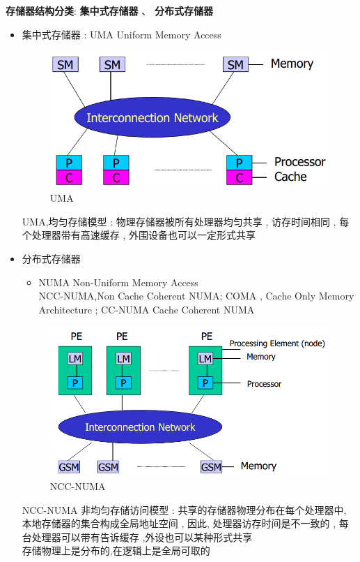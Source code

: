 \documentclass[UTF8,a4paper]{ctexart}
\begin{document}
  \textbf{存储器结构分类}: \textbf{集中式存储器} 、 \textbf{分布式存储器}
  \begin{itemize}
    \item 集中式存储器 : UMA Uniform Memory Access
    \begin{figure}[H]
      \centering
      \includegraphics[scale = 0.3]{assets/ParallelComputing_c3b59.png}
      \caption{UMA}
    \end{figure}
    UMA,均匀存储模型 : 物理存储器被所有处理器均匀共享 , 访存时间相同 , 每个处理器带有高速缓存 , 外围设备也可以一定形式共享
    \item 分布式存储器
    \begin{itemize}
      \item NUMA Non-Uniform Memory Access\\
      NCC-NUMA,Non Cache Coherent NUMA; COMA , Cache Only Memory Architecture ; CC-NUMA Cache Coherent NUMA
    \end{itemize}
    \begin{figure}[H]
      \centering
      \includegraphics[scale = 0.3]{assets/ParallelComputing_1d9bd.png}
      \caption{NCC-NUMA}
    \end{figure}
      NCC-NUMA 非均匀存储访问模型 : 共享的存储器物理分布在每个处理器中, 本地存储器的集合构成全局地址空间 , 因此, 处理器访存时间是不一致的 , 每台处理器可以带有告诉缓存 ,外设也可以某种形式共享\\
      存储物理上是分布的,在逻辑上是全局可取的


\end{itemize}
\end{document}
